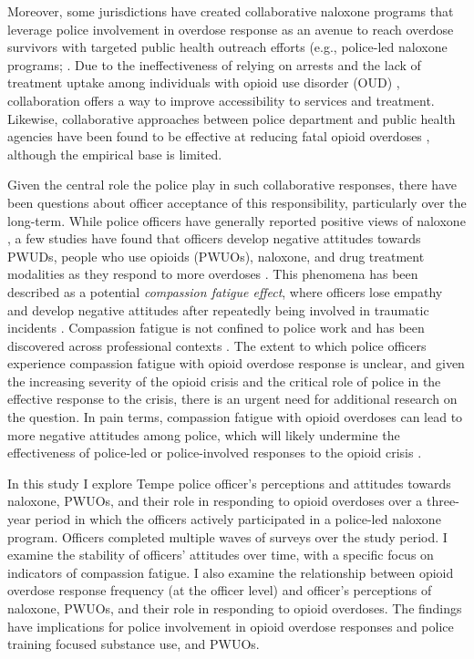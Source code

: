 Moreover, some jurisdictions have created collaborative naloxone programs that leverage police involvement in overdose response as an avenue to reach overdose survivors with targeted public health outreach efforts (e.g., police-led naloxone programs; \parencite{donnelly_law_2022, formica_characteristics_2021, yatsco_alternatives_2020}. Due to the ineffectiveness of relying on arrests and the lack of treatment uptake among individuals with opioid use disorder (OUD) \parencite{dowell_treatment_2024}, collaboration offers a way to improve accessibility to services and treatment. Likewise, collaborative approaches between police department and public health agencies have been found to be effective at reducing fatal opioid overdoses \parencite{donnelly_law_2022, xuan_association_2023}, although the empirical base is limited.

Given the central role the police play in such collaborative responses, there have been questions about officer acceptance of this responsibility, particularly over the long-term. While police officers have generally reported positive views of naloxone \parencite{purviance_law_2017, pourtaher_naloxone_2022, wagner_training_2016, white_narcan_2021}, a few studies have found that officers develop negative attitudes towards PWUDs, people who use opioids (PWUOs), naloxone, and drug treatment modalities as they respond to more overdoses \parencite{carroll_knowledge_2020, murphy_police_2020, murphy_police_2021}. This phenomena has been described as a potential \textit{compassion fatigue effect}, where officers lose empathy and develop negative attitudes after repeatedly being involved in traumatic incidents \parencite{figley_compassion_1995, figley_treating_2002}. Compassion fatigue is not confined to police work and has been discovered across professional contexts \parencite{adams_compassion_2006}. The extent to which police officers experience compassion fatigue with opioid overdose response is unclear, and given the increasing severity of the opioid crisis and the critical role of police in the effective response to the crisis, there is an urgent need for additional research on the question. In pain terms, compassion fatigue with opioid overdoses can lead to more negative attitudes among police, which will likely undermine the effectiveness of police-led or police-involved responses to the opioid crisis \parencite{winstanley_bell_2020}.

In this study I explore Tempe police officer's perceptions and attitudes towards naloxone, PWUOs, and their role in responding to opioid overdoses over a three-year period in which the officers actively participated in a police-led naloxone program. Officers completed multiple waves of surveys over the study period. I examine the stability of officers’ attitudes over time, with a specific focus on indicators of compassion fatigue. I also examine the relationship between opioid overdose response frequency (at the officer level) and officer's perceptions of naloxone, PWUOs, and their role in responding to opioid overdoses. The findings have implications for police involvement in opioid overdose responses and police training focused substance use, and PWUOs.

